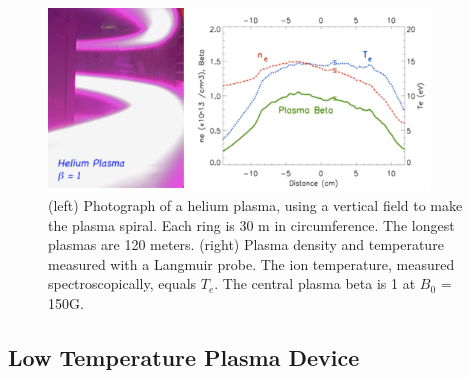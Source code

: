 \documentclass[11pt]{article}
\begin{document}
\begin{figure}[h] %
   \centering
   \includegraphics[width=0.9\textwidth]{etpd2.jpg} 
   \caption{ (left) Photograph of a helium plasma, using a vertical field to make the plasma spiral.  Each ring is 30 m in circumference.  The longest plasmas are 120 meters. (right) Plasma density and temperature measured with a Langmuir probe.  The ion temperature, measured spectroscopically, equals $T_{e}$. The central plasma beta is 1 at $B_{0}$ = 150G.  }
   \label{fig:etpd2}
\end{figure}

\pagebreak
\subsection{Low Temperature Plasma Device}


\end{document}
